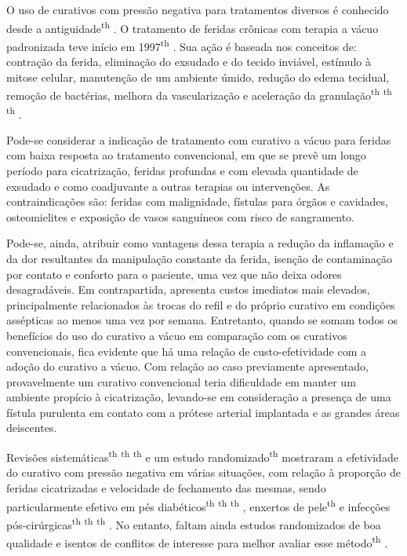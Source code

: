 \documentclass[numberinsection,times,10pt,spreadimages]{memoir}
\begin{document}
O uso de curativos com pressão negativa para tratamentos diversos é conhecido
desde a
antiguidade\textsuperscript{th}
. O tratamento de
feridas crônicas com terapia a vácuo padronizada teve início em
1997\textsuperscript{th}
. Sua ação é baseada nos conceitos
de: contração da ferida, eliminação do exsudado e do tecido inviável, estímulo à
mitose celular, manutenção de um ambiente úmido, redução do edema tecidual,
remoção
de bactérias, melhora da vascularização e aceleração da
granulação\textsuperscript{th}
\textsuperscript{th}
\textsuperscript{th}
.

Pode-se considerar a indicação de tratamento com curativo a vácuo para feridas
com
baixa resposta ao tratamento convencional, em que se prevê um longo período para
cicatrização, feridas profundas e com elevada quantidade de exsudado e como
coadjuvante a outras terapias ou intervenções. As contraindicações são: feridas
com
malignidade, fístulas para órgãos e cavidades, osteomielites e exposição de
vasos
sanguíneos com risco de sangramento.

Pode-se, ainda, atribuir como vantagens dessa terapia a redução da inflamação e
da
dor resultantes da manipulação constante da ferida, isenção de contaminação por
contato e conforto para o paciente, uma vez que não deixa odores desagradáveis.
Em
contrapartida, apresenta custos imediatos mais elevados, principalmente
relacionados
às trocas do refil e do próprio curativo em condições assépticas ao menos uma
vez
por semana. Entretanto, quando se somam todos os benefícios do uso do curativo a
vácuo em comparação com os curativos convencionais, fica evidente que há uma
relação
de custo-efetividade com a adoção do curativo a vácuo. Com relação ao caso
previamente apresentado, provavelmente um curativo convencional teria
dificuldade em
manter um ambiente propício à cicatrização, levando-se em consideração a
presença de
uma fístula purulenta em contato com a prótese arterial implantada e as grandes
áreas deiscentes.

Revisões sistemáticas\textsuperscript{th}
\textsuperscript{th}
\textsuperscript{th}
e um estudo randomizado\textsuperscript{th}
mostraram a efetividade do curativo com pressão
negativa em várias situações, com relação à proporção de feridas cicatrizadas e
velocidade de fechamento das mesmas, sendo particularmente efetivo em pés
diabéticos\textsuperscript{th}
\textsuperscript{th}
\textsuperscript{th}
, enxertos de pele\textsuperscript{th}
e infecções pós-cirúrgicas\textsuperscript{th}
\textsuperscript{th}
\textsuperscript{th}
. No entanto, faltam ainda estudos randomizados
de boa qualidade e isentos de conflitos de interesse para melhor avaliar esse
método\textsuperscript{th}
.
\end{document}
